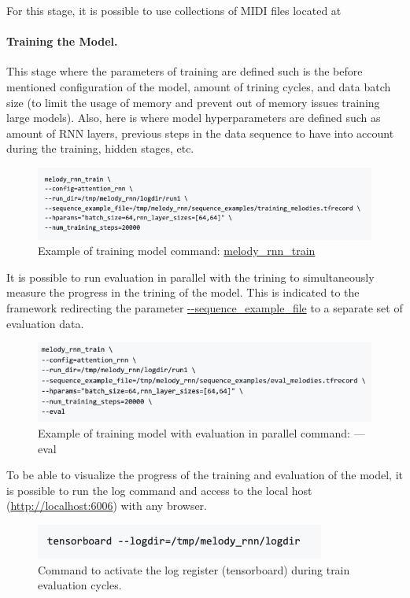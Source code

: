 For this stage, it is possible to use collections of MIDI files located at

\paragraph{Training the Model.} This stage where the parameters of training are defined
such is the before mentioned configuration of the model, amount of trining cycles, and
data batch size (to limit the usage of memory and prevent out of memory issues training
large models). Also, here is where model hyperparameters are defined such as amount of RNN
layers, previous steps in the data sequence to have into account during the training,
hidden stages, etc.

\begin{figure}[h!]
  \includegraphics[width=\linewidth]{image/fig_JDF05.png}
  \caption{Example of training model command: \url{melody_rnn_train}}
\end{figure}

It is possible to run evaluation in parallel with the trining to simultaneously measure
the progress in the trining of the model. This is indicated to the framework redirecting
the parameter \url{--sequence_example_file} to a separate set of evaluation data.

\begin{figure}[h!]
  \includegraphics[width=\linewidth]{image/fig_JDF06.png}
  \caption{Example of training model with evaluation in parallel command: —eval}
\end{figure}


To be able to visualize the progress of the training and evaluation of the model, it is
possible to run the log command and access to the local host (\url{http://localhost:6006})
with any browser.

\begin{figure}[h!]
  \includegraphics[width=\linewidth]{image/fig_JDF07.png}
  \caption{Command to activate the log register (tensorboard) during train evaluation
    cycles.}
\end{figure}



